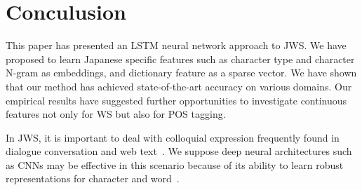 \documentclass[11pt,letterpaper]{article}
\begin{document}

\section{Conculusion}
This paper has presented an LSTM neural network approach to JWS. We have proposed to learn Japanese specific features such as character type and character N-gram as embeddings, and dictionary feature as a sparse vector. We have shown that our method has achieved state-of-the-art accuracy on various domains. 
Our empirical results have suggested further opportunities to investigate continuous features not only for WS but also for POS tagging. 

In JWS, it is important to deal with colloquial expression frequently found in dialogue conversation and web text~\cite{saito-EtAl:2014:Coling,sasano-kurohashi-okumura:2013:IJCNLP,kaji-kitsuregawa:2014:EMNLP2014}. We suppose deep neural architectures such as CNNs  may be effective in  this scenario because of its ability to learn robust representations for character and word~\cite{ling-EtAl:2015:EMNLP2}. 

\end{document}
